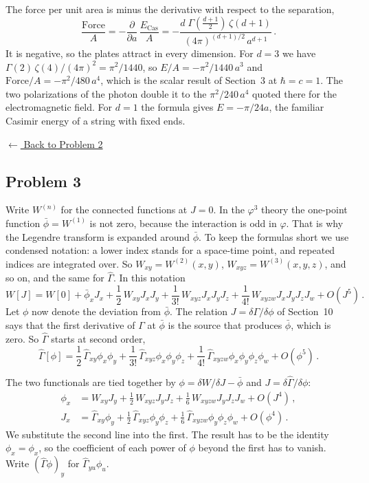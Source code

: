  The force per unit area is minus the derivative with respect
to the separation,
\[
\frac{\text{Force}}A=-\frac{\partial}{\partial a}\,\frac{E_{\text{Cas}}}A
=-\frac{d\;\Gamma\left(\frac{d+1}2\right)\,\zeta(d+1)}{(4\pi)^{(d+1)/2}\,a^{d+1}}\,.
\]
It is negative, so the plates attract in every dimension. For $d=3$ we have
$\Gamma(2)\,\zeta(4)/(4\pi)^2=\pi^2/1440$, so $E/A=-\pi^2/1440\,a^3$ and
$\text{Force}/A=-\pi^2/480\,a^4$, which is the scalar result of Section~3 at
$\hbar=c=1$. The two polarizations of the photon double it to the
$\pi^2/240\,a^4$ quoted there for the electromagnetic field. For $d=1$ the formula gives $E=-\pi/24a$, the familiar Casimir
energy of a string with fixed ends.

\noindent\hyperref[hw:2]{$\leftarrow$ Back to Problem 2}

\subsection{Problem 3}\label{sol:3}

 Write $W^{(n)}$ for the connected functions at $J=0$. In
the $\varphi^3$ theory the one-point function $\bar\phi=W^{(1)}$ is not zero,
because the interaction is odd in $\varphi$. That is why the Legendre transform
is expanded around $\bar\phi$. To keep the formulas short we use condensed
notation: a lower index stands for a space-time point, and repeated indices are
integrated over. So $W_{xy}=W^{(2)}(x,y)$, $W_{xyz}=W^{(3)}(x,y,z)$, and so on,
and the same for $\hat\Gamma$. In this notation
\[
W[J]=W[0]+\bar\phi_xJ_x+\frac12\,W_{xy}J_xJ_y+\frac1{3!}\,W_{xyz}J_xJ_yJ_z+\frac1{4!}\,W_{xyzw}J_xJ_yJ_zJ_w+O(J^5)\,.
\]
Let $\phi$ now denote the deviation from $\bar\phi$. The relation
$J=\delta\Gamma/\delta\phi$ of Section~10 says that the first derivative of
$\Gamma$ at $\bar\phi$ is the source that produces $\bar\phi$, which is zero.
So $\hat\Gamma$ starts at second order,
\[
\hat\Gamma[\phi]=\frac12\,\hat\Gamma_{xy}\phi_x\phi_y+\frac1{3!}\,\hat\Gamma_{xyz}\phi_x\phi_y\phi_z+\frac1{4!}\,\hat\Gamma_{xyzw}\phi_x\phi_y\phi_z\phi_w+O(\phi^5)\,.
\]

 The two functionals are tied together by
$\phi=\delta W/\delta J-\bar\phi$ and $J=\delta\hat\Gamma/\delta\phi$:
\begin{align*}
\phi_x&=W_{xy}J_y+\frac12\,W_{xyz}J_yJ_z+\frac16\,W_{xyzw}J_yJ_zJ_w+O(J^4)\,,\\
J_x&=\hat\Gamma_{xy}\phi_y+\frac12\,\hat\Gamma_{xyz}\phi_y\phi_z+\frac16\,\hat\Gamma_{xyzw}\phi_y\phi_z\phi_w+O(\phi^4)\,.
\end{align*}
We substitute the second line into the first. The result has to be the
identity $\phi_x=\phi_x$, so the coefficient of each power of $\phi$ beyond the
first has to vanish. Write $(\hat\Gamma\phi)_y$ for $\hat\Gamma_{yu}\phi_u$.

